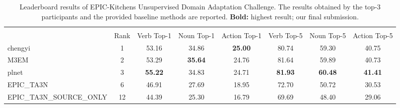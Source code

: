\setlength\heavyrulewidth{0.31ex}

\begin{table*}[t]
\centering
\begin{adjustbox}{width=0.85\linewidth, margin=0ex 1ex 0ex 0ex}
\begin{tabular}{l|c|cccccc}
\toprule\noalign{\smallskip}
\multicolumn{8}{c}{\normalsize\textsc{Unsupervised Domain Adaptation Leaderboard}} \\
\noalign{\smallskip}
\cline{1-8}
\noalign{\smallskip}
  & Rank & \multicolumn{1}{c}{Verb Top-1} & Noun Top-1 & Action Top-1& Verb Top-5 & Noun Top-5 & Action Top-5\\ 
 \noalign{\smallskip} \hline
 chengyi        &1          & 53.16      & 34.86      & \textbf{25.00}        & 80.74      & 59.30      & 40.75        \\ \hline
M3EM             &2        & 53.29      & \textbf{35.64 }     & 24.76        & 81.64      & 59.89      & 40.73        \\ \hline
\rowcolor[HTML]{AFDAAF} 
 plnet        & 3            &\textbf{ 55.22}      & 34.83      & 24.71        & \textbf{81.93 }     & \textbf{60.48}      & \textbf{41.41}        \\ \hline
 EPIC\_TA3N \cite{damen2020rescaling}      & 6      & 46.91      & 27.69      & 18.95        & 72.70      & 50.72      & 30.53        \\ \hline
 EPIC\_TA3N\_SOURCE\_ONLY  \cite{damen2020rescaling} & 12 & 44.39      & 25.30      & 16.79        & 69.69      & 48.40      & 29.06   \\ 
\bottomrule
\end{tabular}
\end{adjustbox}
\caption{Leaderboard results of EPIC-Kitchens Unsupervised Domain Adaptation Challenge. The results obtained by the top-3 participants and the provided baseline methods are reported. \textbf{Bold:} highest result; {} our final submission. }
\label{leaderboard}
\end{table*}


